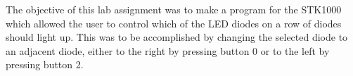 The objective of this lab assignment was to make a program for the STK1000 which allowed the user to control which of the LED diodes on a row of diodes should light up.
This was to be accomplished by changing the selected diode to an adjacent diode, either to the right by pressing button 0 or to the left by pressing button 2.

